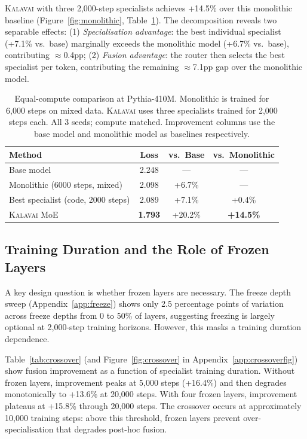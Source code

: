 \documentclass{article}
\newcommand{\kalavai}{\textsc{Kalavai}\xspace}
\begin{document}
\kalavai with three 2,000-step specialists achieves +14.5\% over this monolithic baseline (Figure~\ref{fig:monolithic}, Table~\ref{tab:monolithic}). The decomposition reveals two separable effects: (1) \emph{Specialisation advantage}: the best individual specialist (+7.1\% vs.\ base) marginally exceeds the monolithic model (+6.7\% vs.\ base), contributing $\approx$0.4pp; (2) \emph{Fusion advantage}: the router then selects the best specialist per token, contributing the remaining $\approx$7.1pp gap over the monolithic model.

\begin{table}[h]
\centering
\caption{Equal-compute comparison at Pythia-410M. Monolithic is trained for 6,000 steps on mixed data. \kalavai uses three specialists trained for 2,000 steps each. All 3 seeds; compute matched. Improvement columns use the base model and monolithic model as baselines respectively.}
\label{tab:monolithic}
\begin{tabular}{lccc}
\toprule
\textbf{Method} & \textbf{Loss} & \textbf{vs.\ Base} & \textbf{vs.\ Monolithic} \\
\midrule
Base model            & 2.248 & ---      & ---       \\
Monolithic (6000 steps, mixed) & 2.098 & +6.7\%  & ---       \\
Best specialist (code, 2000 steps) & 2.089 & +7.1\% & +0.4\% \\
\kalavai MoE          & \textbf{1.793} & +20.2\% & \textbf{+14.5\%} \\
\bottomrule
\end{tabular}
\end{table}

\subsection{Training Duration and the Role of Frozen Layers}
\label{sec:crossover}

A key design question is whether frozen layers are necessary. The freeze depth sweep (Appendix~\ref{app:freeze}) shows only 2.5 percentage points of variation across freeze depths from 0 to 50\% of layers, suggesting freezing is largely optional at 2,000-step training horizons. However, this masks a training duration dependence.

Table~\ref{tab:crossover} (and Figure~\ref{fig:crossover} in Appendix~\ref{app:crossoverfig}) show fusion improvement as a function of specialist training duration. Without frozen layers, improvement peaks at 5,000 steps (+16.4\%) and then degrades monotonically to +13.6\% at 20,000 steps. With four frozen layers, improvement plateaus at +15.8\% through 20,000 steps. The crossover occurs at approximately 10,000 training steps: above this threshold, frozen layers prevent over-specialisation that degrades post-hoc fusion.
\end{document}
